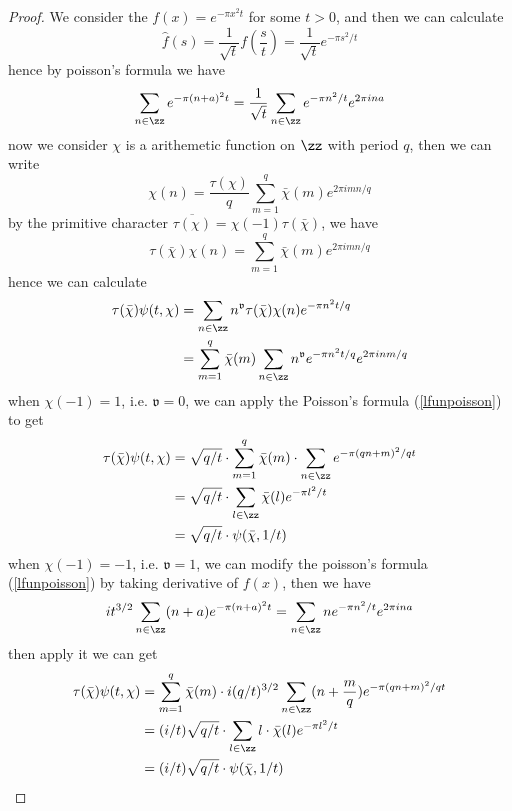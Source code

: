 \begin{proof}
    We consider the \(f(x) = e^{-\pi x^2t}\) for some \(t>0\), and then we can calculate \[\hat{f}(s) = \frac{1}{\sqrt{t}}f(\frac{s}{t}) = \frac{1}{\sqrt{t}}e^{-\pi s^2/t}\]
    hence by poisson's formula we have
    \begin{equation} \label{lfunpoisson}
        \sum_{n \in \zz}e^{-\pi (n+a)^2 t} = \frac{1}{\sqrt{t}} \sum_{n \in \zz}e^{-\pi n^2/t} e^{2\pi i n a}
    \end{equation}
    now we consider \(\chi\) is a arithemetic function on \(\zz\) with period \(q\), then we can write
    \[\chi(n) = \frac{\tau(\chi)}{q}\sum_{m=1}^{q}\bar{\chi}(m)e^{2\pi i mn/q}\]
    by the primitive character \(\overline{\tau(\chi)} = \chi(-1)\tau(\bar{\chi})\), we have
    \[\tau(\bar{\chi}) \chi(n) = \sum_{m=1}^{q}\bar{\chi}(m)e^{2\pi i mn/q}\]
    hence we can calculate
    \begin{align*}
        \tau(\bar{\chi})\psi(t,\chi) &= \sum_{n \in \zz}n^{\mathfrak{v}}\tau(\bar{\chi})\chi(n)e^{-\pi n^2 t/q} \\
        &= \sum_{m=1}^{q} \bar{\chi}(m) \sum_{n \in \zz} n^{\mathfrak{v}} e^{-\pi n^2 t/q}e^{2 \pi i n m/q} \\
    \end{align*}
    when \(\chi(-1) = 1\), i.e. \(\mathfrak{v} = 0\), we can apply the Poisson's formula (\ref{lfunpoisson}) to get 
    \begin{align*}
        \tau(\bar{\chi})\psi(t,\chi) &= \sqrt{q/t} \cdot \sum_{m=1}^{q} \bar{\chi}(m) \cdot \sum_{n \in \zz} e^{-\pi (qn+m)^2/q t} \\
        &= \sqrt{q/t} \cdot \sum_{l \in \zz} \bar{\chi}(l) e^{-\pi l^2/t} \\
        &= \sqrt{q/t} \cdot \psi(\bar{\chi},1/t)
    \end{align*}
    when \(\chi(-1) = -1\), i.e. \(\mathfrak{v} = 1\), we can modify the poisson's formula (\ref{lfunpoisson}) by taking derivative of \(f(x)\), then we have 
    \[it^{3/2}\sum_{n \in \zz}(n+a) e^{-\pi (n+a)^2 t} = \sum_{n \in \zz} n e^{-\pi n^2/t} e^{2\pi i n a}\]
    then apply it we can get
    \begin{align*}
        \tau(\bar{\chi})\psi(t,\chi) &= \sum_{m=1}^{q} \bar{\chi}(m) \cdot i(q/t)^{3/2} \sum_{n \in \zz} (n+\frac{m}{q}) e^{-\pi (qn+m)^2/qt} \\
        &= (i/t)\sqrt{q/t} \cdot \sum_{l \in \zz} l\cdot\bar{\chi}(l) e^{-\pi l^2/t} \\
        &= (i/t)\sqrt{q/t} \cdot \psi(\bar{\chi},1/t)
    \end{align*}
\end{proof}

